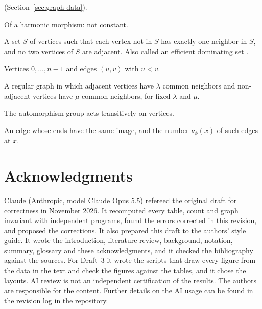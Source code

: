 \documentclass[12pt,letterpaper]{article}
\theoremstyle{definition}
\begin{document}
\begin{description}
(Section~\ref{sec:graph-data}).
\item[non-trivial] Of a harmonic morphism: not constant.
\item[perfect code] A set $S$ of vertices such that each vertex not in $S$
has exactly one neighbor in $S$, and no two vertices of $S$ are adjacent.
Also called an efficient dominating set \cite{Bi73}.
\item[standard form] Vertices $0,\dots,n-1$ and edges $(u,v)$ with $u<v$.
\item[strongly regular] A regular graph in which adjacent vertices have
$\lambda$ common neighbors and non-adjacent vertices have $\mu$ common
neighbors, for fixed $\lambda$ and $\mu$.
\item[vertex transitive] The automorphism group acts transitively on
vertices.
\item[vertical edge, vertical multiplicity] An edge whose ends have the
same image, and the number $\nu_\phi(x)$ of such edges at $x$.
\end{description}

\section*{Acknowledgments}

Claude (Anthropic, model Claude Opus 5.5) refereed the original draft for
correctness in November 2026. It recomputed every table, count and graph
invariant with independent programs, found the errors corrected in this
revision, and proposed the corrections. It also prepared this draft to the
authors' style guide. It wrote the introduction, literature review,
background, notation, summary, glossary and these acknowledgments, and it
checked the bibliography against the sources. For Draft~3 it wrote the
scripts that draw every figure from the data in the text and check the
figures against the tables, and it chose the layouts. AI review is not an
independent certification of the results. The authors are responsible for
the content. Further details on the AI usage can be found in the revision
log in the repository.
\end{document}
